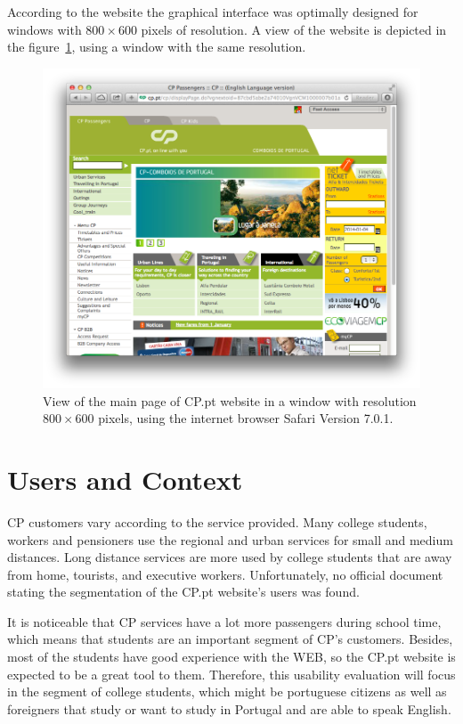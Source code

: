 \documentclass[a4paper]{article}
\begin{document}
According to the website the graphical interface was optimally designed for windows with $800\times 600$ pixels of resolution. A view of the website is depicted in the figure~\ref{fig:cp_home}, using a window with the same resolution. 

\begin{figure}[h] 
	\centering
	\includegraphics[width=\textwidth]{figures/cp_home}
 	\caption{View of the main page of CP.pt website in a window with resolution $800\times 600$ pixels, using the internet browser Safari Version 7.0.1.}\label{fig:cp_home}
\end{figure}

\section{Users and Context}
\label{sec:users_context}

CP customers vary according to the service provided. Many college students, workers and pensioners use the regional and urban services for small and medium distances. Long distance services are more used by college students that are away from home, tourists, and executive workers. Unfortunately, no official document stating the segmentation of the CP.pt website's users was found.

It is noticeable that CP services have a lot more passengers during school time, which means that students are an important segment of CP's customers. Besides, most of the students have good experience with the WEB, so the CP.pt website is expected to be a great tool to them. Therefore, this usability evaluation will focus in the segment of college students, which might be portuguese citizens as well as foreigners that study or want to study in Portugal and are able to speak English.
\end{document}
